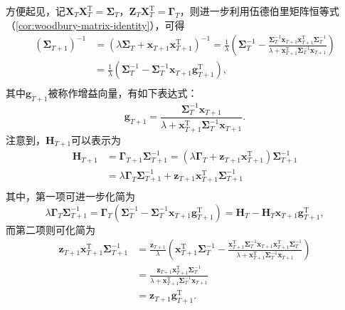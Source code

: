 方便起见，记\( \mathbf{X}_T \mathbf{X}_T^\mathrm{T} = \mathbf{\Sigma}_T \)，\( \mathbf{Z}_T \mathbf{X}_T^{\mathrm{T}} = \mathbf{\Gamma}_T \)，则进一步利用伍德伯里矩阵恒等式（\cref{cor:woodbury-matrix-identity}），可得
\[
    \begin{split}
        \left( \mathbf{\Sigma}_{T+1} \right)^{-1} & = \left( \lambda \mathbf{\Sigma}_T + \bm{x}_{T+1}\bm{x}_{T+1}^\mathrm{T} \right)^{-1}  = \frac{1}{\lambda} \left( \mathbf{\Sigma}_T^{-1} - \frac{\mathbf{\Sigma}_T^{-1} \bm{x}_{T+1} \bm{x}_{T+1}^\mathrm{T} \mathbf{\Sigma}_T^{-1}}{\lambda + \bm{x}_{T+1}^\mathrm{T} \mathbf{\Sigma}_T^{-1} \bm{x}_{T+1}} \right) \\
                                                  & = \frac{1}{\lambda} \left( \mathbf{\Sigma}_T^{-1} - \mathbf{\Sigma}_{T}^{-1} \bm{x}_{T+1} \bm{g}_{T+1}^{\mathrm{T}} \right),                                                                                                                                                                                        \\
    \end{split}
\]
其中\( \bm{g}_{T+1} \)被称作增益向量，有如下表达式：
\[
    \bm{g}_{T+1} = \frac{\mathbf{\Sigma}_T^{-1} \bm{x}_{T+1}}{\lambda + \bm{x}_{T+1}^\mathrm{T} \mathbf{\Sigma}_T^{-1} \bm{x}_{T+1}}.
\]
注意到，\( \mathbf{H}_{T+1} \)可以表示为
\[
    \begin{split}
        \mathbf{H}_{T+1} & = \mathbf{\Gamma}_{T+1} \mathbf{\Sigma}_{T+1}^{-1} = (\lambda \mathbf{\Gamma}_T + \bm{z}_{T+1}\bm{x}_{T+1}^\mathrm{T}) \mathbf{\Sigma}_{T+1}^{-1} \\
                         & = \lambda \mathbf{\Gamma}_T \mathbf{\Sigma}_{T+1}^{-1} + \bm{z}_{T+1}\bm{x}_{T+1}^\mathrm{T} \mathbf{\Sigma}_{T+1}^{-1}                           \\
    \end{split}
\]
其中，第一项可进一步化简为
\[
    \lambda \mathbf{\Gamma}_T \mathbf{\Sigma}_{T+1}^{-1} = \mathbf{\Gamma}_T \left(  \mathbf{\Sigma}_T^{-1} -  \mathbf{\Sigma}_{T}^{-1} \bm{x}_{T+1} \bm{g}_{T+1}^{\mathrm{T}} \right) = \mathbf{H}_T - \mathbf{H}_T \bm{x}_{T+1} \bm{g}_{T+1}^{\mathrm{T}},
\]
而第二项则可化简为
\[
    \begin{split}
        \bm{z}_{T+1}\bm{x}_{T+1}^\mathrm{T} \mathbf{\Sigma}_{T+1}^{-1} & = \frac{\bm{z}_{T+1}}{\lambda} \left( \bm{x}_{T+1}^{\mathrm{T}} \mathbf{\Sigma}_T^{-1}  - \frac{ \bm{x}_{T+1}^{\mathrm{T}} \mathbf{\Sigma}_{T}^{-1} \bm{x}_{T+1} \bm{x}_{T+1}^\mathrm{T} \mathbf{\Sigma}_{T}^{-1} }{\lambda + \bm{x}_{T+1}^\mathrm{T} \mathbf{\Sigma}_{T}^{-1} \bm{x}_{T+1}} \right) \\
                                                                       & = \frac{ \bm{z}_{T+1} \bm{x}_{T+1}^{\mathrm{T}} \mathbf{\Sigma}_T^{-1} }{\lambda + \bm{x}_{T+1}^\mathrm{T} \mathbf{\Sigma}_{T}^{-1} \bm{x}_{T+1}}                                                                                                                                                    \\
                                                                       & =\bm{z}_{T+1} \bm{g}_{T+1}^{\mathrm{T}}.
    \end{split}
\]
